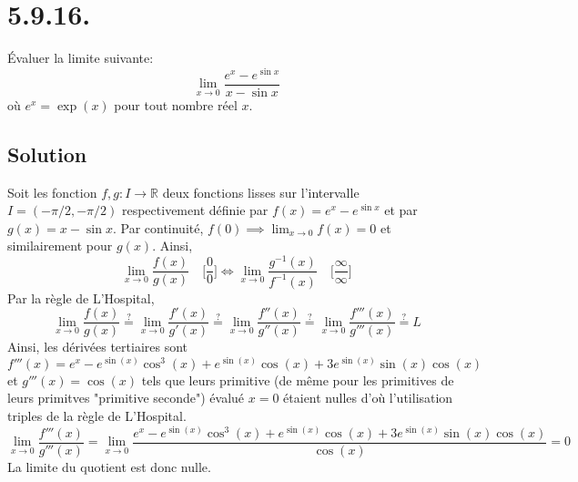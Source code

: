 \section*{5.9.16.}
	Évaluer la limite suivante: \[\lim_{x\to 0}\frac{e^x-e^{\sin x}}{x-\sin x}\]
	où $e^x=\exp (x)$ pour tout nombre réel $x$.
	\subsection*{Solution}
		Soit les fonction $f,g : I\longrightarrow\mathbb{R}$ deux fonctions lisses sur l'intervalle $I=(-\pi/2,-\pi/2)$ respectivement définie par $f(x)=e^x-e^{\sin x}$ et par $g(x)=x-\sin x$. Par continuité, $f(0)\implies\lim_{x\to 0}f(x)=0$ et similairement pour $g(x)$. Ainsi,
		\[\lim_{x\to 0}\frac{f(x)}{g(x)}\quad\Big[\frac{0}{0}\Big]\Longleftrightarrow\lim_{x\to 0}\frac{g^{-1}(x)}{f^{-1}(x)}\quad\Big[\frac{\infty}{\infty}\Big]\]
		Par la règle de L'Hospital,
		\[\lim_{x\to 0}\frac{f(x)}{g(x)} \stackrel{?}{=}\lim_{x\to 0}\frac{f'(x)}{g'(x)}\stackrel{?}{=}\lim_{x\to 0}\frac{f''(x)}{g''(x)}\stackrel{?}{=}\lim_{x\to 0}\frac{f'''(x)}{g'''(x)}\stackrel{?}{=}L\]
		Ainsi, les dérivées tertiaires sont  $f'''(x)=e^x-e^{\sin (x)} \cos ^3(x)+e^{\sin (x)} \cos (x)+3 e^{\sin (x)} \sin (x) \cos
		(x)$ et $g'''(x)=\cos (x)$ tels que leurs primitive (de même pour les primitives de leurs primitves "primitive seconde") évalué $x=0$ étaient nulles d'où l'utilisation triples de la règle de L'Hospital.
		\[\lim_{x\to 0}\frac{f'''(x)}{g'''(x)}=\lim_{x\to 0} \frac{e^x-e^{\sin (x)} \cos ^3(x)+e^{\sin (x)} \cos (x)+3 e^{\sin (x)} \sin (x) \cos
			(x)}{\cos (x)}=0\]
		La limite du quotient est donc nulle.
		
		
